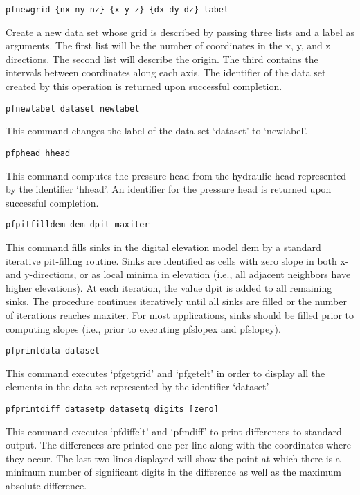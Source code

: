 \begin{description}
\item{\begin{verbatim}pfnewgrid {nx ny nz} {x y z} {dx dy dz} label\end{verbatim}}
Create a new data set whose grid is described by passing three lists and a label as arguments.  
The first list will be the number of coordinates in the x, y, and z directions.  
The second list will describe the origin. The third contains the intervals between coordinates along each axis. 
The identifier of the data set created by this operation is returned upon successful completion.

\item{\begin{verbatim}pfnewlabel dataset newlabel\end{verbatim}}
This command changes the label of the data set `dataset' to
`newlabel'.
 

\item{\begin{verbatim}pfphead hhead\end{verbatim}}
This command computes the pressure head from the hydraulic head   
represented by the identifier `hhead'.  An identifier for the pressure
head is returned upon successful completion.

\item{\begin{verbatim}pfpitfilldem dem dpit maxiter \end{verbatim}}
This command fills sinks in the digital elevation model dem by a standard iterative 
pit-filling routine. Sinks are identified as cells with zero slope in both x- and 
y-directions, or as local minima in elevation (i.e., all adjacent neighbors have 
higher elevations). At each iteration, the value dpit is added to all remaining 
sinks. The procedure continues iteratively until all sinks are filled or the number
of iterations reaches maxiter. For most applications, sinks should be filled prior
to computing slopes (i.e., prior to executing pfslopex and pfslopey).

        
\item{\begin{verbatim}pfprintdata dataset\end{verbatim}}
This command executes `pfgetgrid' and `pfgetelt' in order to display
all the elements in the data set represented by the identifier
`dataset'.
        
        
\item{\begin{verbatim}pfprintdiff datasetp datasetq digits [zero]\end{verbatim}}
This command executes `pfdiffelt' and `pfmdiff' to print differences
to standard output.  The differences are printed one per line along
with the coordinates where they occur.  The last two lines displayed  
will show the point at which there is a minimum number of significant 
digits in the difference as well as the maximum absolute difference.
        

\end{description}

